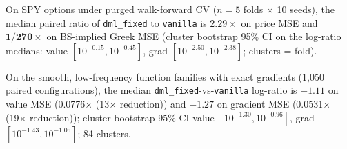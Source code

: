 On SPY options under purged walk-forward CV (\(n=5\) folds × 10 seeds), the median paired ratio of \texttt{dml\_fixed} to \texttt{vanilla} is \(\mathbf{2.29\times}\) on price MSE and \(\mathbf{1/270\times}\) on BS-implied Greek MSE (cluster bootstrap 95\% CI on the log-ratio medians: value \([10^{-0.15}, 10^{+0.45}]\), grad \([10^{-2.50}, 10^{-2.38}]\); clusters = fold).

On the smooth, low-frequency function families with exact gradients (1{,}050 paired configurations), the median \texttt{dml\_fixed}-vs-\texttt{vanilla} log-ratio is \(\mathbf{-1.11}\) on value MSE (0.0776× (13× reduction)) and \(\mathbf{-1.27}\) on gradient MSE (0.0531× (19× reduction)); cluster bootstrap 95\% CI value \([10^{-1.30}, 10^{-0.96}]\), grad \([10^{-1.43}, 10^{-1.05}]\); 84 clusters.
